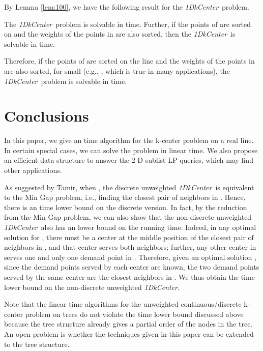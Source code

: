 \documentclass{llncs}
\def\problem{{\it 1DkCenter}}
\begin{document}
By Lemma \ref{lem:100}, we have the following result for the \problem\
problem.

\begin{theorem}\label{theo:continuous}
The \problem\ problem is solvable in  time. Further, if
the points of  are sorted on  and the weights of the
points in  are also sorted, then the \problem\ is solvable in
 time.
\end{theorem}

Therefore, if the points of  are sorted on the line  and
the weights of the points in  are also sorted, for small 
(e.g., , which is true in
many applications), the \problem\
problem is solvable in  time.




\section{Conclusions}
\label{sec:conclusion}

In this paper, we give an  time algorithm for the k-center
problem on a real line. In certain special cases, we can solve the
problem in linear time.
We also propose an efficient data structure to answer the 2-D sublist LP queries, which may find other applications.

As suggested by Tamir,
when , the discrete unweighted \problem\ is equivalent to the Min
Gap problem, i.e., finding the closest pair of neighbors in .
Hence, there is an  time lower bound on the discrete
version. In fact, by the reduction from the Min Gap problem, we can
also show that the non-discrete unweighted \problem\ also has an
 lower bound on the running time. Indeed, in any optimal
solution  for , there must be a
center at the middle position of the closest pair of neighbors in ,
and that center serves both neighbors; further, any
other center in  serves one and only one demand point in .
Therefore, given an optimal solution , since the demand points
served by each center are known, the two demand points served by the
same center are the closest neighbors in . We thus obtain the
 time lower bound on the non-discrete unweighted \problem.


Note that the linear time algorithms for the unweighted
continuous/discrete k-center
problem on trees \cite{ref:FredericksonPa91} do not violate the
 time lower
bound discussed above because the tree
structure already gives a partial order of the nodes in the tree.
An open problem is whether the techniques given in this paper can be
extended to the tree structure.
\end{document}
